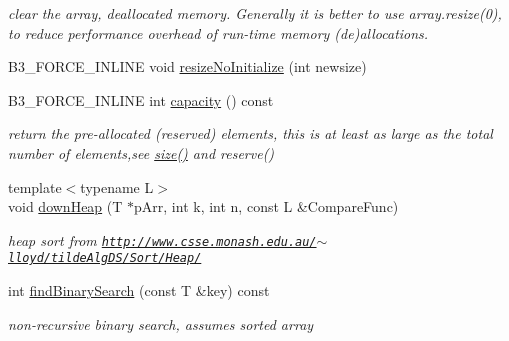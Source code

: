 \begin{CompactItemize}
\begin{CompactList}\small\item\em clear the array, deallocated memory. Generally it is better to use array.resize(0), to reduce performance overhead of run-time memory (de)allocations. \item\end{CompactList}\item 
B3\_\-FORCE\_\-INLINE void \hyperlink{classb3_aligned_object_array_5f21071bc7b73c1a0b4fcfde123e5182}{resizeNoInitialize} (int newsize)
\item 
\hypertarget{classb3_aligned_object_array_f12b97105f8275e72b22b9a75f3899bd}{
B3\_\-FORCE\_\-INLINE int \hyperlink{classb3_aligned_object_array_f12b97105f8275e72b22b9a75f3899bd}{capacity} () const }
\label{classb3_aligned_object_array_f12b97105f8275e72b22b9a75f3899bd}

\begin{CompactList}\small\item\em return the pre-allocated (reserved) elements, this is at least as large as the total number of elements,see \hyperlink{classb3_aligned_object_array_18672b9373a0a957d49677195fde6a85}{size()} and reserve() \item\end{CompactList}\item 
\hypertarget{classb3_aligned_object_array_e0e0c7551263cd737dea5e527e5c5bed}{
{\footnotesize template$<$typename L$>$ }\\void \hyperlink{classb3_aligned_object_array_e0e0c7551263cd737dea5e527e5c5bed}{downHeap} (T $\ast$pArr, int k, int n, const L \&CompareFunc)}
\label{classb3_aligned_object_array_e0e0c7551263cd737dea5e527e5c5bed}

\begin{CompactList}\small\item\em heap sort from \href{http://www.csse.monash.edu.au/~lloyd/tildeAlgDS/Sort/Heap/}{\tt http://www.csse.monash.edu.au/$\sim$lloyd/tildeAlgDS/Sort/Heap/} \item\end{CompactList}\item 
\hypertarget{classb3_aligned_object_array_0094f3242fba631391910c0a2e88da84}{
int \hyperlink{classb3_aligned_object_array_0094f3242fba631391910c0a2e88da84}{findBinarySearch} (const T \&key) const }
\label{classb3_aligned_object_array_0094f3242fba631391910c0a2e88da84}

\begin{CompactList}\small\item\em non-recursive binary search, assumes sorted array \item\end{CompactList}\end{CompactItemize}


